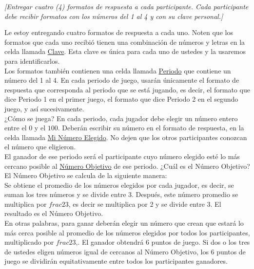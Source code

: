 \begin{center}
\textit{[Entregar cuatro (\textit{4}) formatos de respuesta a cada participante. Cada participante debe recibir formatos con los números del 1 al 4 y con su clave personal.]}\\
\end{center}

Le estoy entregando cuatro formatos de respuesta a cada uno. Noten que los formatos que cada uno recibió tienen una combinación de números y letras en la celda llamada \underline{Clave}. Esta clave es única para cada uno de ustedes y la usaremos para identificarlos.\\

Los formatos también contienen una celda llamada \underline{Periodo} que contiene un número del 1 al 4. En cada periodo de juego, usarán únicamente el formato de respuesta que corresponda al periodo que se está jugando, es decir, el formato que dice Periodo 1 en el primer juego, el formato que dice Periodo 2 en el segundo juego, y así sucesivamente.\\

¿Cómo se juega? En cada periodo, cada jugador debe elegir un número entero entre el $0$ y el $100$. Deberán escribir su número en el formato de respuesta, en la celda llamada \underline{Mi Número Elegido}. No dejen que los otros participantes conozcan el número que eligieron.\\

El ganador de ese periodo será el participante cuyo número elegido esté lo más cercano posible al \underline{Número Objetivo} de ese periodo. ¿Cuál es el Número Objetivo? El Número Objetivo se calcula de la siguiente manera:\\

Se obtiene el promedio de los números elegidos por cada jugador, es decir, se suman los tres números y se divide entre 3. Después, este número promedio se multiplica por $frac{2}{3}$, es decir se multiplica por 2 y se divide entre 3. El resultado es el Número Objetivo.\\

En otras palabras, para ganar deberán elegir un número que crean que estará lo más cerca posible al promedio de los números elegidos por todos los participantes, multiplicado por $frac{2}{3}$,. El ganador obtendrá 6 puntos de juego. Si dos o los tres de ustedes eligen números igual de cercanos al Número Objetivo, los 6 puntos de juego se dividirán equitativamente entre todos los participantes ganadores.\\


